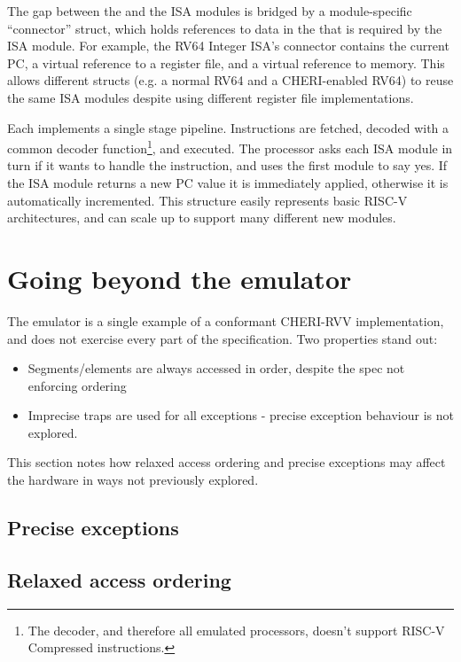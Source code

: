 The gap between the  and the ISA modules is bridged by a module-specific ``connector'' struct, which holds references to data in the  that is required by the ISA module.
For example, the RV64 Integer ISA's connector contains the current PC, a virtual reference to a register file, and a virtual reference to memory.
This allows different  structs (e.g. a normal RV64 and a CHERI-enabled RV64) to reuse the same ISA modules despite using different register file implementations.

Each  implements a single stage pipeline.
Instructions are fetched, decoded with a common decoder function\footnote{The decoder, and therefore all emulated processors, doesn't support RISC-V Compressed instructions.}, and executed.
The processor asks each ISA module in turn if it wants to handle the instruction, and uses the first module to say yes.
If the ISA module returns a new PC value it is immediately applied, otherwise it is automatically incremented.
This structure easily represents basic RISC-V architectures, and can scale up to support many different new modules.






\section{Going beyond the emulator}
The emulator is a single example of a conformant CHERI-RVV implementation, and does not exercise every part of the specification.
Two properties stand out:
\begin{itemize}
    \item Segments/elements are always accessed in order, despite the spec not enforcing ordering
    \item Imprecise traps are used for all exceptions - precise exception behaviour is not explored.
\end{itemize}
This section notes how relaxed access ordering and precise exceptions may affect the hardware in ways not previously explored.

\subsection{Precise exceptions}

\subsection{Relaxed access ordering}




